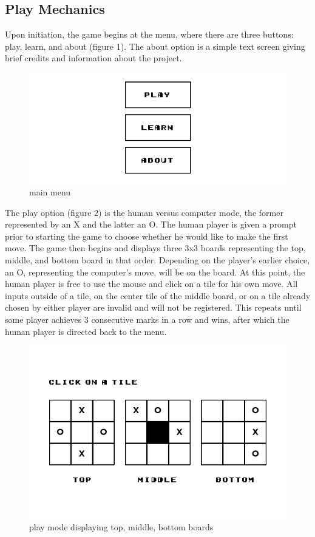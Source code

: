\documentclass[preprint,12pt]{elsarticle}
\begin{document}
	\subsection{Play Mechanics}
		Upon initiation, the game begins at the menu, where there are three buttons: play, learn, and about (figure 1). The about option is a simple text screen giving brief credits and information about the project.

		\begin{figure}[h]
			\centering\includegraphics[width=0.5\linewidth]{0.jpg}
			\caption{main menu}
		\end{figure}

		The play option (figure 2) is the human versus computer mode, the former represented by an X and the latter an O. The human player is given a prompt prior to starting the game to choose whether he would like to make the first move. The game then begins and displays three 3x3 boards representing the top, middle, and bottom board in that order. Depending on the player's earlier choice, an O, representing the computer's move, will be on the board. At this point, the human player is free to use the mouse and click on a tile for his own move. All inputs outside of a tile, on the center tile of the middle board, or on a tile already chosen by either player are invalid and will not be registered. This repeats until some player achieves 3 consecutive marks in a row and wins, after which the human player is directed back to the menu.

		\begin{figure}[h]
			\centering\includegraphics[width=0.5\linewidth]{1.jpg}
			\caption{play mode displaying top, middle, bottom boards}
		\end{figure}
\end{document}
